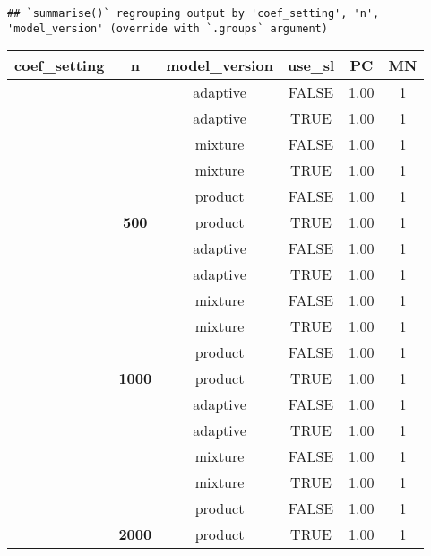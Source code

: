 \documentclass[
]{article}
\begin{document}
\begin{verbatim}
## `summarise()` regrouping output by 'coef_setting', 'n', 'model_version' (override with `.groups` argument)
\end{verbatim}

\begin{tabular}[t]{>{}c>{}ccccc}
\toprule
coef\_setting & n & model\_version & use\_sl & PC & MN\\
\midrule
 &  & adaptive & FALSE & 1.00 & 1\\

 &  & adaptive & TRUE & 1.00 & 1\\

 &  & mixture & FALSE & 1.00 & 1\\

 &  & mixture & TRUE & 1.00 & 1\\

 &  & product & FALSE & 1.00 & 1\\

 & \multirow{-6}{*}{\centering\arraybackslash \textbf{500}} & product & TRUE & 1.00 & 1\\

 &  & adaptive & FALSE & 1.00 & 1\\

 &  & adaptive & TRUE & 1.00 & 1\\

 &  & mixture & FALSE & 1.00 & 1\\

 &  & mixture & TRUE & 1.00 & 1\\

 &  & product & FALSE & 1.00 & 1\\

 & \multirow{-6}{*}{\centering\arraybackslash \textbf{1000}} & product & TRUE & 1.00 & 1\\

 &  & adaptive & FALSE & 1.00 & 1\\

 &  & adaptive & TRUE & 1.00 & 1\\

 &  & mixture & FALSE & 1.00 & 1\\

 &  & mixture & TRUE & 1.00 & 1\\

 &  & product & FALSE & 1.00 & 1\\

 & \multirow{-6}{*}{\centering\arraybackslash \textbf{2000}} & product & TRUE & 1.00 & 1\\


\end{tabular}
\end{document}
